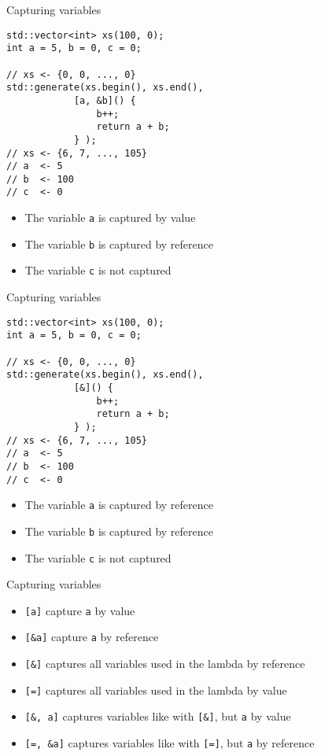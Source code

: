 \documentclass[10pt]{beamer}
\begin{document}
\begin{frame}[fragile,label={sec:orgddf8b02}]{Capturing variables}
 \begin{verbatim}
std::vector<int> xs(100, 0);
int a = 5, b = 0, c = 0;

// xs <- {0, 0, ..., 0}
std::generate(xs.begin(), xs.end(),
            [a, &b]() {
                b++;
                return a + b;
            } );
// xs <- {6, 7, ..., 105}
// a  <- 5
// b  <- 100
// c  <- 0
\end{verbatim}
\begin{itemize}
\item The variable \texttt{a} is captured by \alert{\alert{value}}
\item The variable \texttt{b} is captured by \alert{\alert{reference}}
\item The variable \texttt{c} is not captured
\end{itemize}
\end{frame}

\begin{frame}[fragile,label={sec:org2a42341}]{Capturing variables}
 \begin{verbatim}
std::vector<int> xs(100, 0);
int a = 5, b = 0, c = 0;

// xs <- {0, 0, ..., 0}
std::generate(xs.begin(), xs.end(),
            [&]() {
                b++;
                return a + b;
            } );
// xs <- {6, 7, ..., 105}
// a  <- 5
// b  <- 100
// c  <- 0
\end{verbatim}
\begin{itemize}
\item The variable \texttt{a} is captured by \alert{\alert{reference}}
\item The variable \texttt{b} is captured by \alert{\alert{reference}}
\item The variable \texttt{c} is not captured
\end{itemize}
\end{frame}

\begin{frame}[fragile,label={sec:org7c7c815}]{Capturing variables}
 \begin{itemize}
\item \texttt{[a]} capture \texttt{a} by \alert{\alert{value}}
\item \texttt{[\&a]} capture \texttt{a} by \alert{\alert{reference}}
\item \texttt{[\&]} captures \alert{\alert{all}} variables used in the lambda by \alert{\alert{reference}}
\item \texttt{[=]} captures \alert{\alert{all}} variables used in the lambda by \alert{\alert{value}}
\item \texttt{[\&, a]} captures variables like with \texttt{[\&]}, but \texttt{a} by value
\item \texttt{[=, \&a]} captures variables like with \texttt{[=]}, but \texttt{a} by reference
\end{itemize}
\end{frame}
\end{document}
